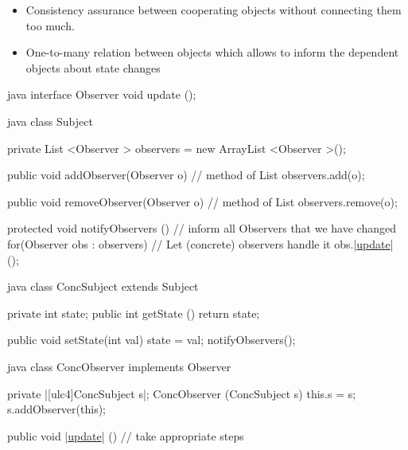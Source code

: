 \begin{figure}[H]	
  \centering
    \resizebox{\linewidth}{!}{\tikzset{font=\Huge}}
\end{figure}
\begin{intentbox}[Intent]\nospacing
  \begin{itemize}
      \item Consistency assurance between cooperating objects without connecting them too much.
      \item  One-to-many relation between objects which allows to inform the
        dependent objects about state changes
  \end{itemize}
\end{intentbox}
\begin{codeboxNl}[Observer]{java}
  interface Observer{
    void update ();
  }
\end{codeboxNl}
\begin{codeboxNl}[Subject]{java}
class Subject {
  private List <Observer > observers = new ArrayList <Observer >();

  public void addObserver(Observer o) {
    // method of List
    observers.add(o);
  }

  public void removeObserver(Observer o) {
    // method of List
    observers.remove(o);
  }

  protected void notifyObservers () {
    // inform all Observers that we have changed
    for(Observer obs : observers) {
      // Let (concrete) observers handle it
      obs.|\ul{update}| ();
    }
  }
}
\end{codeboxNl}
\begin{codeboxNl}{java}
class ConcSubject extends Subject {
  private int state;
  public int getState (){
    return state;
  }

  public void setState(int val){
    state = val;
    notifyObservers();
  }
}
\end{codeboxNl}
\begin{codeboxNl}{java}
class ConcObserver implements Observer {
  private |\ul[ulc4]{ConcSubject s}|;
  ConcObserver (ConcSubject s){
    this.s = s;
    s.addObserver(this);
  }

  public void |\ul{update}| (){
    // take appropriate steps
  }
}
\end{codeboxNl}
